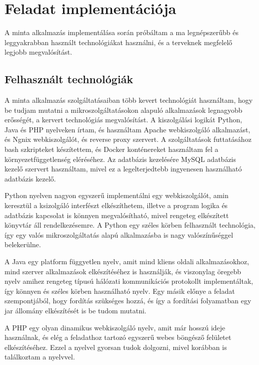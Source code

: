 \documentclass[11pt,magyar,a4paper,twoside,]{report}
\begin{document}
\chapter{Feladat implementációja}\label{feladat-implementuxe1ciuxf3ja}

A minta alkalmazás implementálása során próbáltam a ma legnépszerűbb és
leggyakrabban használt technológiákat használni, és a terveknek
megfelelő legjobb megvalósítást.

\section{Felhasznált
technológiák}\label{felhasznuxe1lt-technoluxf3giuxe1k}

A minta alkalmazás szolgáltatásaiban több kevert technológiát
használtam, hogy be tudjam mutatni a mikroszolgáltatásokon alapuló
alkalmazások legnagyobb erősségét, a kervert technológiás megvalósítást.
A kiszolgálási logikát Python, Java és PHP nyelveken írtam, és
használtam Apache webkiszolgáló alkalmazást, és Ngnix webkiszolgálót, és
reverse proxy szervert. A szolgáltatások futtatásához bash szkripteket
készítettem, és Docker konténereket használtam fel a
környezetfüggetlenség eléréséhez. Az adatbázis kezelésére MySQL
adatbázis kezelő szervert használtam, mivel ez a legelterjedtebb
ingyenesen használható adatbázis kezelő.

Python nyelven nagyon egyszerű implementálni egy webkiszolgálót, amin
keresztül a ksizolgáló interfészt elkészíthetem, illetve a program
logika és adatbázis kapcsolat is könnyen megvalósítható, mivel rengeteg
elkészített könyvtár áll rendelkezésemre. A Python egy széles körben
felhasznált technológia, így egy valós mikroszolgáltatás alapú
alkalmazásba is nagy valószínűséggel belekerülne.

A Java egy platform függyetlen nyelv, amit mind kliens oldali
alkalmazásokhoz, mind szerver alkalmazások elkészítéséhez is használják,
és viszonylag öregebb nyelv amihez rengeteg típusú hálózati
kommunikációs protokollt implementáltak, így könnyen és széles körben
használható nyelv. Egy másik előnye a feladat szempontjából, hogy
fordítás szükséges hozzá, és így a fordítási folyamatban egy jar
állomány elkészítését is be tudom mutatni.

A PHP egy olyan dinamikus webkiszolgáló nyelv, amit már hosszú ideje
használnak, és elég a feladathoz tartozó egyszerű webes böngésző
felületet elkészítéséhez. Ezzel a nyelvel gyorsan tudok dolgozni, mivel
korábban is találkoztam a nyelvvel.
\end{document}
